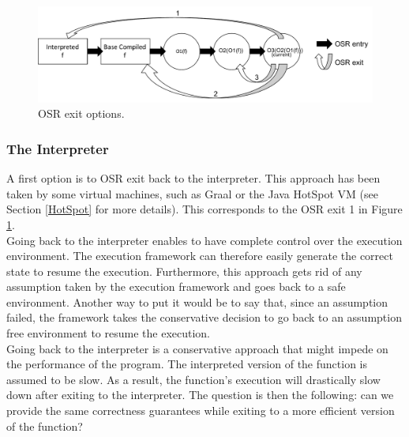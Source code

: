 \begin{figure}[h]
\centering
\includegraphics[scale=0.5]{Figures/wheretoexit}
\decoRule
\caption[OSR exit options]{OSR exit options.}
\label{OSR exit options}
\end{figure}

\subsubsection{The Interpreter}
A first option is to OSR exit back to the interpreter. 
This approach has been taken by some virtual machines, such as Graal\cite{duboscq2014speculation} or the Java HotSpot VM\cite{paleczny2001java} (see Section \ref{HotSpot} for more details).
This corresponds to the OSR exit 1 in Figure \ref{OSR exit options}.\\

Going back to the interpreter enables to have complete control over the execution environment.
The execution framework can therefore easily generate the correct state to resume the execution.
Furthermore, this approach gets rid of any assumption taken by the execution framework and goes back to a safe environment.
Another way to put it would be to say that, since an assumption failed, the framework takes the conservative decision to go back to an assumption free environment to resume the execution.\\

Going back to the interpreter is a conservative approach that might impede on the performance of the program.
The interpreted version of the function is assumed to be slow.
As a result, the function's execution will drastically slow down after exiting to the interpreter.
The question is then the following: can we provide the same correctness guarantees while exiting to a more efficient version of the function?\\

